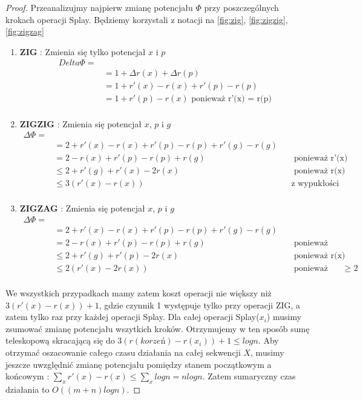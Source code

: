 \documentclass[declaration,shortabstract]{iithesis}
\theoremstyle{remark}
\theoremstyle{plain}
\theoremstyle{plain}
\theoremstyle{plain}
\begin{document}
\begin{proof}
Przeanalizujmy najpierw zmianę potencjału \(\Phi\) przy poszczególnych krokach operacji Splay. Będziemy korzystali z notacji na \ref{fig:zig}, \ref{fig:zigzig}, \ref{fig:zigzag} \\
\begin{enumerate}
\item{\textbf{ZIG} : Zmienia się tylko potencjał $x$ i $p$
\begin{align*}
Delta \Phi = \\
& = 1 + \Delta r(x) + \Delta r(p) \\
& = 1 + r'(x) - r(x) + r'(p) - r(p) \\
& = 1 + r'(p) - r(x) \text{ ponieważ r'(x) = r(p)}\\
\end{align*}}
\item{\textbf{ZIGZIG} : Zmienia się potencjał $x$, $p$ i $g$
\begin{align*}
\Delta \Phi =  \\
& = 2 + r'(x) - r(x) + r'(p) - r(p) + r'(g) - r(g)\\
& =2 - r(x) + r'(p) - r(p) + r(g)   && \text{ ponieważ r'(x) = r(g)}\\
& \leq 2 + r'(g) + r'(x) - 2r(x) && \text{ ponieważ r(x) < r(p) i r'(x) > r(p)}\\
& \leq 3(r'(x) - r(x)) && \text{z wypukłości funkcji logarytmicznej}\\
\end{align*}}
\item{\textbf{ZIGZAG} : Zmienia się potencjał $x$, $p$ i $g$
\begin{align*}
\Delta \Phi = \\
& = 2 + r'(x) - r(x) + r'(p) - r(p) + r'(g) - r(g)\\
& = 2 - r(x) + r'(p) - r(p) + r(g)   && \text{ ponieważ r'(x) = r(g)}\\
& \leq 2 + r'(g) + r'(p) - 2r(x) && \text{ ponieważ r(x) < r(p)}\\
& \leq 2(r'(x) -2r(x)) && \text{ ponieważ 2r'(x) - r'(p) - r'(g) $\geq$ 2}\\
\end{align*}}
\end{enumerate}
We wszystkich przypadkach mamy zatem koszt operacji nie większy niż \( 3(r'(x) - r(x)) + 1\), gdzie czynnik 1 występuje tylko przy operacji ZIG, a zatem tylko raz przy każdej operacji Splay. Dla całej operacji Splay(\(x_i\)) musimy zsumować zmianę potencjału wszytkich kroków. Otrzymujemy w ten sposób sumę teleskopową skracającą się do \(3(r(korzeń) - r(x_i)) + 1 \leq logn\). Aby otrzymać oszacowanie całego czasu działania na całej sekwencji $X$, musimy jeszcze uwzględnić zmianę potencjału pomiędzy stanem początkowym a końcowym : \( \sum_x r'(x) - r(x) \leq \sum_x logn = nlogn\). Zatem sumaryczny czas działania to \( O((m+n)logn)\). 

\end{proof}
\end{document}
